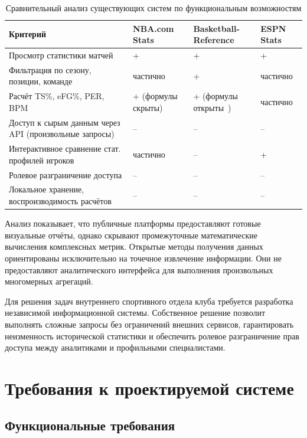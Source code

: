 \begin{table}[H]
\caption{Сравнительный анализ существующих систем по функциональным возможностям}
\label{tab:systems-compare}
\centering
\begin{tabularx}{\textwidth}{|>{\RaggedRight\arraybackslash}p{4.5cm}
  |>{\RaggedRight\centering\arraybackslash}X
  |>{\RaggedRight\centering\arraybackslash}X
  |>{\RaggedRight\centering\arraybackslash}X|}
\hline
\textbf{Критерий} & \textbf{NBA.com Stats} &
\textbf{Basketball-Reference} & \textbf{ESPN Stats} \\
\hline
Просмотр статистики матчей & + & + & + \\
\hline
Фильтрация по сезону, позиции, команде & \mbox{частично} & + & \mbox{частично} \\
\hline
Расчёт TS\%, eFG\%, PER, BPM
  & + (формулы скрыты)
  & + (формулы открыты~\cite{bpm1,per-bref})
  & частично \\
\hline
Доступ к сырым данным через API (произвольные запросы) & -- & -- & -- \\
\hline
Интерактивное сравнение стат. профилей игроков & частично & -- & + \\
\hline
Ролевое разграничение доступа & -- & -- & -- \\
\hline
Локальное хранение, воспроизводимость расчётов & -- & -- & -- \\
\hline
\end{tabularx}
\end{table}

Анализ показывает, что публичные платформы предоставляют готовые визуальные
отчёты, однако скрывают промежуточные математические вычисления комплексных
метрик. Открытые методы получения данных ориентированы исключительно
на точечное извлечение информации. Они не предоставляют аналитического
интерфейса для выполнения произвольных многомерных агрегаций.

Для решения задач внутреннего спортивного отдела клуба требуется разработка
независимой информационной системы. Собственное решение позволит выполнять
сложные запросы без ограничений внешних сервисов, гарантировать неизменность
исторической статистики и обеспечить ролевое разграничение прав доступа
между аналитиками и профильными специалистами.

\section{Требования к проектируемой системе}

\subsection{Функциональные требования}

